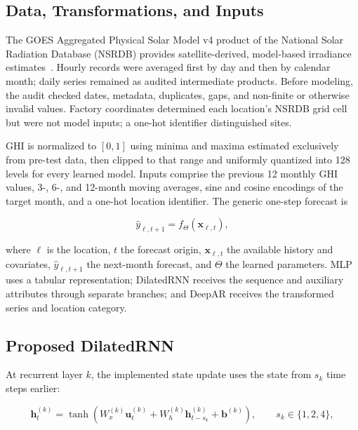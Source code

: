 \documentclass[runningheads]{llncs}
\begin{document}
\subsection{Data, Transformations, and Inputs}

The GOES Aggregated Physical Solar Model v4 product of the National Solar Radiation Database (NSRDB) provides satellite-derived, model-based irradiance estimates~\cite{sengupta2018,nlr2026}. Hourly records were averaged first by day and then by calendar month; daily series remained as audited intermediate products. Before modeling, the audit checked dates, metadata, duplicates, gaps, and non-finite or otherwise invalid values. Factory coordinates determined each location's NSRDB grid cell but were not model inputs; a one-hot identifier distinguished sites.

GHI is normalized to $[0,1]$ using minima and maxima estimated exclusively from pre-test data, then clipped to that range and uniformly quantized into 128 levels for every learned model. Inputs comprise the previous 12 monthly GHI values, 3-, 6-, and 12-month moving averages, sine and cosine encodings of the target month, and a one-hot location identifier. The generic one-step forecast is

\begin{equation}
  \widehat y_{\ell,t+1}=f_{\Theta}\!\left(\mathbf{x}_{\ell,t}\right),
  \label{eq:generic}
\end{equation}

where $\ell$ is the location, $t$ the forecast origin, $\mathbf{x}_{\ell,t}$ the available history and covariates, $\widehat y_{\ell,t+1}$ the next-month forecast, and $\Theta$ the learned parameters. MLP uses a tabular representation; DilatedRNN receives the sequence and auxiliary attributes through separate branches; and DeepAR receives the transformed series and location category.

\subsection{Proposed DilatedRNN}

At recurrent layer $k$, the implemented state update uses the state from $s_k$ time steps earlier:

\begin{equation}
  \mathbf h^{(k)}_t=
  \tanh\!\left(
  W^{(k)}_x\mathbf u^{(k)}_t+
  W^{(k)}_h\mathbf h^{(k)}_{t-s_k}+\mathbf b^{(k)}
  \right),\qquad s_k\in\{1,2,4\},
  \label{eq:dilated}
\end{equation}
\end{document}
